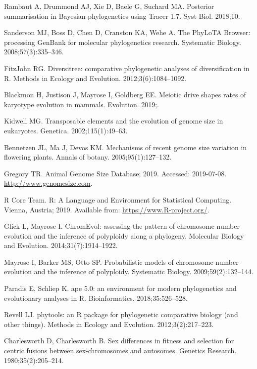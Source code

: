 \documentclass[]{rsos}%
\begin{document}
\begin{thebibliography}{9}
Rambaut A, Drummond AJ, Xie D, Baele G, Suchard MA.
 Posterior summarisation in Bayesian phylogenetics using Tracer 1.7.
 Syst Biol. 2018;10.

Sanderson MJ, Boss D, Chen D, Cranston KA, Wehe A.
 The PhyLoTA Browser: processing GenBank for molecular phylogenetics
  research.
 Systematic Biology. 2008;57(3):335--346.

FitzJohn RG.
 Diversitree: comparative phylogenetic analyses of diversification in
  {R}.
 Methods in Ecology and Evolution. 2012;3(6):1084--1092.

Blackmon H, Justison J, Mayrose I, Goldberg EE.
 Meiotic drive shapes rates of karyotype evolution in mammals.
 Evolution. 2019;.

Kidwell MG.
 Transposable elements and the evolution of genome size in eukaryotes.
 Genetica. 2002;115(1):49--63.

Bennetzen JL, Ma J, Devos KM.
 Mechanisms of recent genome size variation in flowering plants.
 Annals of botany. 2005;95(1):127--132.

Gregory TR. Animal Genome Size Database; 2019.
 Accessed: 2019-07-08.
 \url{http://www.genomesize.com}.

{R Core Team}. R: A Language and Environment for Statistical Computing.
 Vienna, Austria; 2019.
 Available from: \url{https://www.R-project.org/}.

Glick L, Mayrose I.
 ChromEvol: assessing the pattern of chromosome number evolution and
  the inference of polyploidy along a phylogeny.
 Molecular Biology and Evolution. 2014;31(7):1914--1922.

Mayrose I, Barker MS, Otto SP.
 Probabilistic models of chromosome number evolution and the inference
  of polyploidy.
 Systematic Biology. 2009;59(2):132--144.

Paradis E, Schliep K.
 ape 5.0: an environment for modern phylogenetics and evolutionary
  analyses in {R}.
 Bioinformatics. 2018;35:526--528.

Revell LJ.
 phytools: an R package for phylogenetic comparative biology (and
  other things).
 Methods in Ecology and Evolution. 2012;3(2):217--223.

Charlesworth D, Charlesworth B.
 Sex differences in fitness and selection for centric fusions between
  sex-chromosomes and autosomes.
 Genetics Research. 1980;35(2):205--214.


\end{thebibliography}
\end{document}
